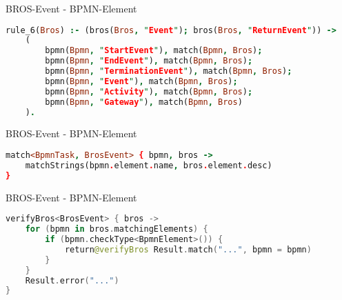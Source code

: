 \begin{frame}[fragile]{BROS-Event - BPMN-Element}
\begin{lstlisting}[language=Prolog]
rule_6(Bros) :- (bros(Bros, "Event"); bros(Bros, "ReturnEvent")) ->
    (
        bpmn(Bpmn, "StartEvent"), match(Bpmn, Bros);
        bpmn(Bpmn, "EndEvent"), match(Bpmn, Bros);
        bpmn(Bpmn, "TerminationEvent"), match(Bpmn, Bros);
        bpmn(Bpmn, "Event"), match(Bpmn, Bros);
        bpmn(Bpmn, "Activity"), match(Bpmn, Bros);
        bpmn(Bpmn, "Gateway"), match(Bpmn, Bros)
    ).
\end{lstlisting}
\end{frame}

\begin{frame}[fragile]{BROS-Event - BPMN-Element}
\begin{lstlisting}[language=Prolog]
match<BpmnTask, BrosEvent> { bpmn, bros ->
    matchStrings(bpmn.element.name, bros.element.desc)
}
\end{lstlisting}
\end{frame}

\begin{frame}[fragile]{BROS-Event - BPMN-Element}
\begin{lstlisting}[language=Kotlin]
verifyBros<BrosEvent> { bros ->
    for (bpmn in bros.matchingElements) {
        if (bpmn.checkType<BpmnElement>()) {
            return@verifyBros Result.match("...", bpmn = bpmn)
        }
    }
    Result.error("...")
}
\end{lstlisting}
\end{frame}